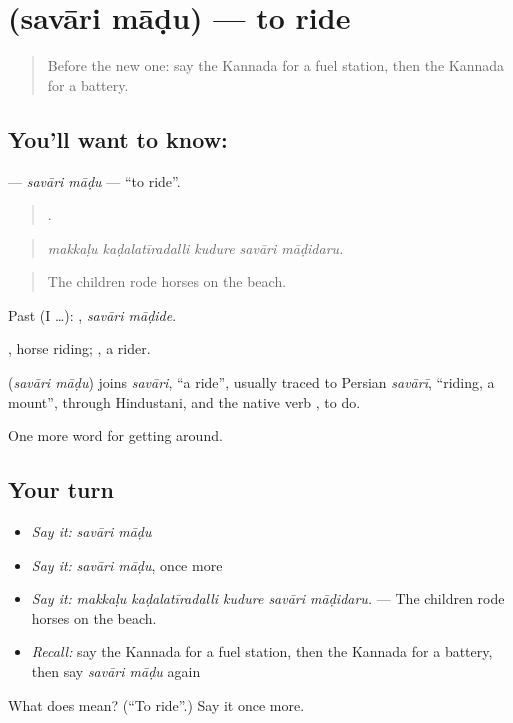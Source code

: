 \section[\texorpdfstring{\kn{ಸವಾರಿ} \kn{ಮಾಡು} (savāri māḍu)}{ಸವಾರಿ ಮಾಡು (savāri māḍu)}]{  (savāri māḍu) — to ride}

\label{lesson:KA-C448-savari-madu}



\begin{quote}
Before the new one: say the Kannada for a fuel station, then the Kannada for a battery.
\end{quote}

\subsection*{You'll want to know:  }
\textbf{ } — \emph{savāri māḍu} — \textquotedblleft{}to ride\textquotedblright{}.

\begin{quote}
    .
\end{quote}

\begin{quote}
\emph{makkaḷu kaḍalatīradalli kudure savāri māḍidaru.}
\end{quote}

\begin{quote}
The children rode horses on the beach.
\end{quote}

Past (I …):  , \emph{savāri māḍide}.

 , horse riding; , a rider.

\begin{cousinweb}
\textbf{ } (\emph{savāri māḍu}) joins \emph{savāri}, \textquotedblleft{}a ride\textquotedblright{}, usually traced to Persian \emph{savārī}, \textquotedblleft{}riding, a mount\textquotedblright{}, through Hindustani, and the native verb , to do.
\end{cousinweb}

\begin{grammarlens}[title={What you've built}]
One more word for getting around.
\end{grammarlens}

\subsection*{Your turn}
\begin{itemize}
\raggedright
  \item \emph{Say it:} \emph{savāri māḍu}
  \item \emph{Say it:} \emph{savāri māḍu}, once more
  \item \emph{Say it:} \emph{makkaḷu kaḍalatīradalli kudure savāri māḍidaru.} — The children rode horses on the beach.
  \item \emph{Recall:} say the Kannada for a fuel station, then the Kannada for a battery, then say \emph{savāri māḍu} again
\end{itemize}

\begin{tcolorbox}[breakable,colback=teal!4,colframe=teal!35!black,title={Before you move on}]
What does   mean? (\textquotedblleft{}To ride\textquotedblright{}.) Say it once more.
\end{tcolorbox}

